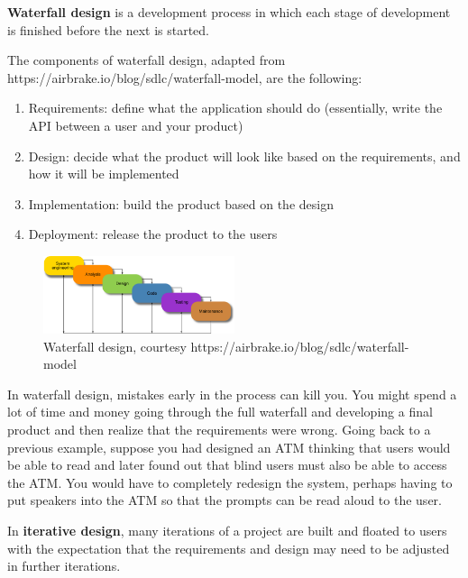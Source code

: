 \begin{definition}
\textbf{Waterfall design} is a development process in which each stage of development is finished before the next is started. 
\end{definition}

The components of waterfall design, adapted from https://airbrake.io/blog/sdlc/waterfall-model, are the following:
\begin{enumerate}
	\item Requirements: define what the application should do (essentially, write the API between a user and your product)
	\item Design: decide what the product will look like based on the requirements, and how it will be implemented
	\item Implementation: build the product based on the design
	\item Deployment: release the product to the users
\end{enumerate}

\begin{figure}
	\centering
	\includegraphics[width=0.5\textwidth]{images/waterfall.png}
	\caption{Waterfall design, courtesy https://airbrake.io/blog/sdlc/waterfall-model}
\end{figure}

In waterfall design, mistakes early in the process can kill you. You might spend a lot of time and money going through the full waterfall and developing a final product and then realize that the requirements were wrong. Going back to a previous example, suppose you had designed an ATM thinking that users would be able to read and later found out that blind users must also be able to access the ATM. You would have to completely redesign the system, perhaps having to put speakers into the ATM so that the prompts can be read aloud to the user. 

\begin{definition}
In \textbf{iterative design}, many iterations of a project are built and floated to users with the expectation that the requirements and design may need to be adjusted in further iterations. 
\end{definition}

